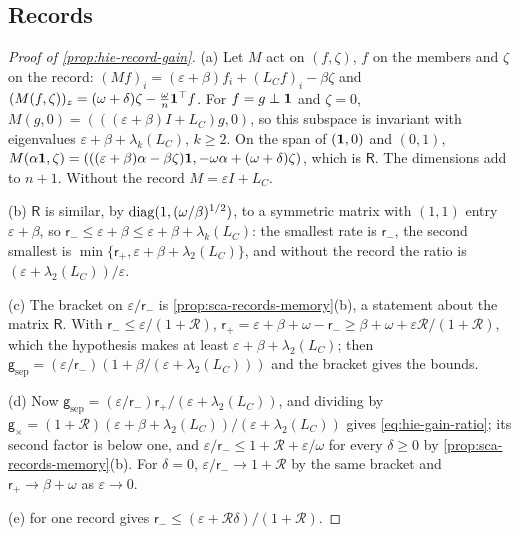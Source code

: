 \subsection*{Records}

\begin{proof}[Proof of \cref{prop:hie-record-gain}]
(a) Let $M$ act on $(f,\zeta)$, $f$ on the members and $\zeta$ on the record: $(Mf)_i=(\varepsilon+\beta)f_i+(L_Cf)_i-\beta\zeta$ and $(M(f,\zeta))_z=(\omega+\delta)\zeta-\frac\omega n\mathbf{1}^\top f$. For $f=g\perp\mathbf{1}$ and $\zeta=0$, $M(g,0)=(((\varepsilon+\beta)I+L_C)g,0)$, so this subspace is invariant with eigenvalues $\varepsilon+\beta+\lambda_k(L_C)$, $k\ge2$. On the span of $(\mathbf{1},0)$ and $(0,1)$, $M(\alpha\mathbf{1},\zeta)=(((\varepsilon+\beta)\alpha-\beta\zeta)\mathbf{1},-\omega\alpha+(\omega+\delta)\zeta)$, which is $\mathsf R$. The dimensions add to $n+1$. Without the record $M=\varepsilon I+L_C$.

(b) $\mathsf R$ is similar, by $\operatorname{diag}(1,(\omega/\beta)^{1/2})$, to a symmetric matrix with $(1,1)$ entry $\varepsilon+\beta$, so $\mathsf r_-\le\varepsilon+\beta\le\varepsilon+\beta+\lambda_k(L_C)$: the smallest rate is $\mathsf r_-$, the second smallest is $\min\{\mathsf r_+,\varepsilon+\beta+\lambda_2(L_C)\}$, and without the record the ratio is $(\varepsilon+\lambda_2(L_C))/\varepsilon$.

(c) The bracket on $\varepsilon/\mathsf r_-$ is \cref{prop:sca-records-memory}(b), a statement about the matrix $\mathsf R$. With $\mathsf r_-\le\varepsilon/(1+\mathcal R)$, $\mathsf r_+=\varepsilon+\beta+\omega-\mathsf r_-\ge\beta+\omega+\varepsilon\mathcal R/(1+\mathcal R)$, which the hypothesis makes at least $\varepsilon+\beta+\lambda_2(L_C)$; then $\mathsf g_{\mathrm{sep}}=(\varepsilon/\mathsf r_-)(1+\beta/(\varepsilon+\lambda_2(L_C)))$ and the bracket gives the bounds.

(d) Now $\mathsf g_{\mathrm{sep}}=(\varepsilon/\mathsf r_-)\mathsf r_+/(\varepsilon+\lambda_2(L_C))$, and dividing by $\mathsf g_\times=(1+\mathcal R)(\varepsilon+\beta+\lambda_2(L_C))/(\varepsilon+\lambda_2(L_C))$ gives \eqref{eq:hie-gain-ratio}; its second factor is below one, and $\varepsilon/\mathsf r_-\le1+\mathcal R+\varepsilon/\omega$ for every $\delta\ge0$ by \cref{prop:sca-records-memory}(b). For $\delta=0$, $\varepsilon/\mathsf r_-\to1+\mathcal R$ by the same bracket and $\mathsf r_+\to\beta+\omega$ as $\varepsilon\to0$.

(e)  for one record gives $\mathsf r_-\le(\varepsilon+\mathcal R\delta)/(1+\mathcal R)$.


\end{proof}
